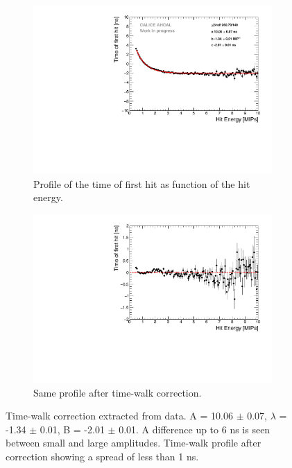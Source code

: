 \begin{figure}[t]
	\begin{subfigure}[t]{0.45\textwidth}
		\centering
		\includegraphics[width=1\textwidth]{chap5/fig_AHCAL_timing/Muons/TimeWalkProfile.pdf}
		\caption{Profile of the time of first hit as function of the hit energy.}\label{fig:time_walk}
	\end{subfigure}
	\hfill
	\begin{subfigure}[t]{0.45\textwidth}
		\centering
		\includegraphics[width=1\textwidth]{chap5/fig_AHCAL_timing/Muons/TimeWalkProfile_Correction.pdf}
		\caption{Same profile after time-walk correction.}\label{fig:time_walk_corr}
	\end{subfigure}
	\caption{ Time-walk correction extracted from data. A = 10.06 $\pm$ 0.07, $\lambda$ = -1.34 $\pm$ 0.01, B = -2.01 $\pm$ 0.01. A difference up to 6 ns is seen between small and large amplitudes.  Time-walk profile after correction showing a spread of less than 1 ns.}
\end{figure}

